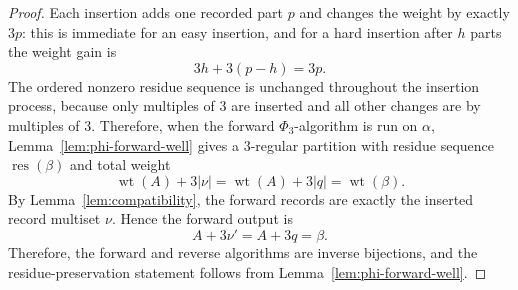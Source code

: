 \documentclass[11pt]{amsart}
\theoremstyle{definition}
\theoremstyle{remark}
\newcommand{\res}{\operatorname{res}}
\newcommand{\wt}{\operatorname{wt}}
\begin{document}
\begin{proof}
Each insertion adds one recorded part \(p\) and changes the weight by exactly
\(3p\): this is immediate for an easy insertion, and for a hard insertion after
\(h\) parts the weight gain is
\[
        3h+3(p-h)=3p.
\]
The ordered nonzero residue sequence is unchanged throughout the insertion
process, because only multiples of \(3\) are inserted and all other changes are
by multiples of \(3\).  Therefore, when the forward \(\Phi_3\)-algorithm is
run on \(\alpha\), Lemma~\ref{lem:phi-forward-well} gives a \(3\)-regular partition
with residue sequence \(\res(\beta)\) and total weight
\[
        \wt(A)+3|\nu|
        =\wt(A)+3|q|
        =\wt(\beta).
\]
By Lemma~\ref{lem:compatibility}, the forward records are exactly the inserted
record multiset \(\nu\).  Hence the forward output is
\[
        A+3\nu'=A+3q=\beta.
\]
Therefore, the forward and reverse algorithms are inverse bijections, and the
residue-preservation statement follows from Lemma~\ref{lem:phi-forward-well}.
\end{proof}
\end{document}

